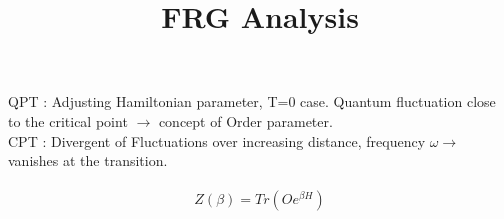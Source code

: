 \documentclass{article}
\title{FRG Analysis}
\begin{document}
QPT : Adjusting Hamiltonian parameter, T=0 case. Quantum fluctuation close to the critical point $\rightarrow$ concept of Order parameter.\\
CPT : Divergent of Fluctuations over increasing distance, frequency $\omega \rightarrow $ vanishes at the transition.\\
\\
\begin{equation}
    Z(\beta)=Tr(Oe^{\beta H})
\end{equation}
\end{document}
